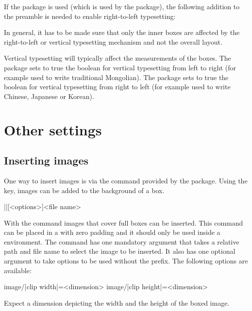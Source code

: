 \documentclass[a4paper]{article}
\begin{document}
If the  package is used (which is used by the  package), the following addition to the preamble is needed to enable right-to-left typesetting:

\begin{codeexample}
\end{codeexample}

In general, it has to be made sure that only the inner boxes are affected by the right-to-left or vertical typesetting mechanism and not the overall layout.

Vertical typesetting will typically affect the measurements of the boxes. The package sets to true the boolean  for vertical typesetting from left to right (for example used to write traditional Mongolian). The package sets to true the boolean  for vertical typesetting from right to left (for example used to write Chinese, Japanese or Korean).

\section{Other settings}

\subsection{Inserting images}

One way to insert images is via the  command provided by the  package. Using the  key, images can be added to the background of a box.

\begin{macrodef}
|\leporelloimage|[<options>]{<file name>}
\end{macrodef}
With the command \macro{\leporelloimage} images that cover full boxes can be inserted. This command can be placed in a  with zero padding and it should only be used inside a  environment. The command has one mandatory argument that takes a relative path and file name to select the image to be inserted. It also has one optional argument to take options to be used without the  prefix. The following options are available:

\begin{macrodef}
image/|clip width|={<dimension>}
image/|clip height|={<dimension>}
\end{macrodef}
Expect a dimension depicting the width and the height of the boxed image.
\end{document}
